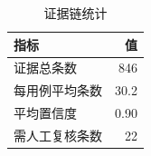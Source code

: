 \begin{table}[hbpt]
\centering
\caption{证据链统计}
\label{tab:evidence_stats}
\small
\begin{tabular}{lr}
\toprule
\textbf{指标} & \textbf{值} \\
\midrule
    证据总条数 & 846 \\
    每用例平均条数 & 30.2 \\
    平均置信度 & 0.90 \\
    需人工复核条数 & 22 \\
\bottomrule
\end{tabular}
\end{table}